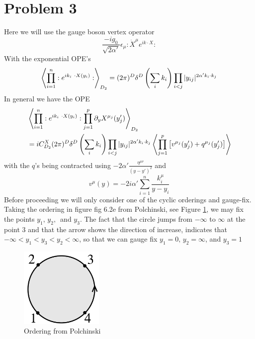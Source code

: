 \documentclass[a4paper,10pt]{article}
\renewcommand\[{\begin{equation*}}
\renewcommand\]{\end{equation*}}
\numberwithin{equation}{section}
\begin{document}
\section*{Problem 3}
Here we will use the gauge boson vertex operator
\begin{equation}
    \frac{-ig_0}{\sqrt{2\alpha'}}\epsilon_\mu :\dot{X}^\mu e^{ik\cdot X}:
\end{equation}
With the exponential OPE's
\begin{equation}
\expval{\prod_{i=1}^n:e^{ik_i\ \cdot X(y_i)}:}_{D_2}=(2\pi)^D\delta^D\left(\sum_ik_i\right)\prod_{i<j}|y_{ij}|^{2\alpha' k_i\cdot k_j}
\end{equation}
In general we have the OPE
\begin{equation} \label{eq:ope}
\begin{aligned}
&\expval{\prod_{i=1}^n:e^{ik_i\ \cdot X(y_i)}:\prod_{j=1}^p\partial_y X^{\mu_j}(y_j')}_{D_2}\\
&=iC_{D_2}^X(2\pi)^D\delta^D\left(\sum_ik_i\right)\prod_{i<j}|y_{ij}|^{2\alpha' k_i\cdot k_j}\expval{\prod_{j=1}^p\left[v^{\mu_j}(y_j')+q^{\mu_j}(y_j')\right]}
\end{aligned}
\end{equation}
with the $q$'s being contracted using $-2\alpha'\frac{\eta^{\mu\nu}}{(y-y')^{2}}$ and 
\begin{equation}\label{eq:vmom}
    v^{\mu}(y)=-2i\alpha'\sum_{i=1}^n\frac{k_i^\mu}{y-y_i}
\end{equation}
Before proceeding we will only consider one of the cyclic orderings and gauge-fix. Taking the ordering in figure fig 6.2e from Polchinski, see Figure \ref{fig:1}, we may fix the points $y_1,\,y_2,\,$ and $y_3$. The fact that the circle jumps from $-\infty $ to $\infty$ at the point 3 and that the arrow shows the direction of increase, indicates that $-\infty< y_1< y_3 < y_2<\infty $, so that we can gauge fix $y_1=0,\,y_2=\infty$, and $y_3=1$
\begin{figure}[htb!]
    \centering
    \includegraphics[width=4cm]{E.png}
    \caption{Ordering from Polchinski}
    \label{fig:1}
\end{figure}
\end{document}

